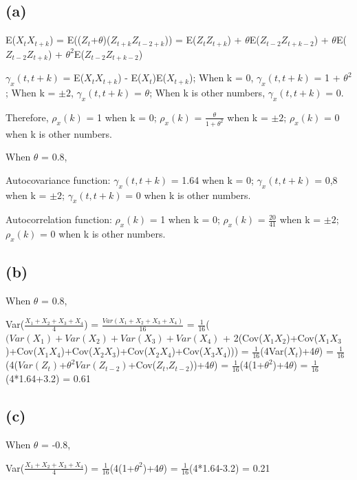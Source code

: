 \documentclass[
]{article}
\begin{document}
\hypertarget{a-3}{%
\subsection{(a)}\label{a-3}}

E(\(X_t\)\(X_{t+k}\)) =
E((\(Z_t\)+\(\theta\))(\(Z_{t+k}\)\(Z_{t-2+k}\))) =
E(\(Z_t\)\(Z_{t+k}\)) + \(\theta\)E(\(Z_{t-2}\)\(Z_{t+k-2}\)) +
\(\theta\)E(\(Z_{t-2}\)\(Z_{t+k}\)) +
\(\theta^2\)E(\(Z_{t-2}\)\(Z_{t+k-2}\))

\(\gamma_x(t,t+k)\) = E(\(X_t\)\(X_{t+k}\)) - E(\(X_t\))E(\(X_{t+k}\));
When k = 0, \(\gamma_x(t,t+k)\) = 1 + \(\theta^2\); When k = \(\pm2\),
\(\gamma_x(t,t+k)\) = \(\theta\); When k is other numbers,
\(\gamma_x(t,t+k)\) = 0.

Therefore, \(\rho_x(k)\) = 1 when k = 0; \(\rho_x(k)\) =
\(\frac{\theta}{1+\theta^2}\) when k = \(\pm2\); \(\rho_x(k)\) = 0 when
k is other numbers.

When \(\theta\) = 0.8,

Autocovariance function: \(\gamma_x(t,t+k)\) = 1.64 when k = 0;
\(\gamma_x(t,t+k)\) = 0,8 when k = \(\pm2\); \(\gamma_x(t,t+k)\) = 0
when k is other numbers.

Autocorrelation function: \(\rho_x(k)\) = 1 when k = 0; \(\rho_x(k)\) =
\(\frac{20}{41}\) when k = \(\pm2\); \(\rho_x(k)\) = 0 when k is other
numbers.

\hypertarget{b-3}{%
\subsection{(b)}\label{b-3}}

When \(\theta\) = 0.8,

Var(\(\frac{X_1+X_2+X_3+X_4}{4}\)) = \(\frac{Var(X_1+X_2+X_3+X_4)}{16}\)
= \(\frac{1}{16}\)(\((Var(X_1)+Var(X_2)+Var(X_3)+Var(X_4)\) +
2(Cov(\(X_1X_2\))+Cov(\(X_1X_3\))+Cov(\(X_1X_4\))+Cov(\(X_2X_3\))+Cov(\(X_2X_4\))+Cov(\(X_3X_4\))))
= \(\frac{1}{16}\)(4Var(\(X_t\))+4\(\theta\)) =
\(\frac{1}{16}\)(4(\(Var(Z_t)\)+\(\theta^2Var(Z_{t-2})\)+Cov(\(Z_t\),\(Z_{t-2}\)))+4\(\theta\))
= \(\frac{1}{16}\)(4(1+\(\theta^2\))+4\(\theta\)) =
\(\frac{1}{16}\)(4*1.64+3.2) = 0.61

\hypertarget{c-1}{%
\subsection{(c)}\label{c-1}}

When \(\theta\) = -0.8,

Var(\(\frac{X_1+X_2+X_3+X_4}{4}\)) =
\(\frac{1}{16}\)(4(1+\(\theta^2\))+4\(\theta\)) =
\(\frac{1}{16}\)(4*1.64-3.2) = 0.21
\end{document}
